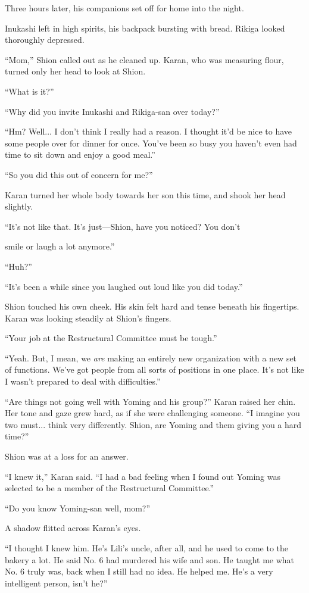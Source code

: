 Three hours later, his companions set off for home into the night.~

Inukashi left in high spirits, his backpack bursting with bread. Rikiga
looked thoroughly depressed.

``Mom,'' Shion called out as he cleaned up. Karan, who was measuring
flour, turned only her head to look at Shion.

``What is it?''

``Why did you invite Inukashi and Rikiga-san over today?''

``Hm? Well... I don't think I really had a reason. I thought it'd be
nice to have some people over for dinner for once. You've been so busy
you haven't even had time to sit down and enjoy a good meal.''

``So you did this out of concern for me?''

Karan turned her whole body towards her son this time, and shook her
head slightly.

``It's not like that. It's just---Shion, have you noticed? You don't~

smile or laugh a lot anymore.''

``Huh?''

``It's been a while since you laughed out loud like you did today.''

Shion touched his own cheek. His skin felt hard and tense beneath his
fingertips. Karan was looking steadily at Shion's fingers.

``Your job at the Restructural Committee must be tough.''

``Yeah. But, I mean, we \emph{are} making an entirely new organization with a
new set of functions. We've got people from all sorts of positions in
one place. It's not like I wasn't prepared to deal with difficulties.''

``Are things not going well with Yoming and his group?'' Karan raised
her chin. Her tone and gaze grew hard, as if she were challenging
someone. ``I imagine you two must... think very differently. Shion, are
Yoming and them giving you a hard time?''

Shion was at a loss for an answer.

``I knew it,'' Karan said. ``I had a bad feeling when I found out Yoming
was selected to be a member of the Restructural Committee.''

``Do you know Yoming-san well, mom?''

A shadow flitted across Karan's eyes.

``I thought I knew him. He's Lili's uncle, after all, and he used to
come to the bakery a lot. He said No. 6 had murdered his wife and son.
He taught me what No. 6 truly was, back when I still had no idea. He
helped me. He's a very intelligent person, isn't he?''

